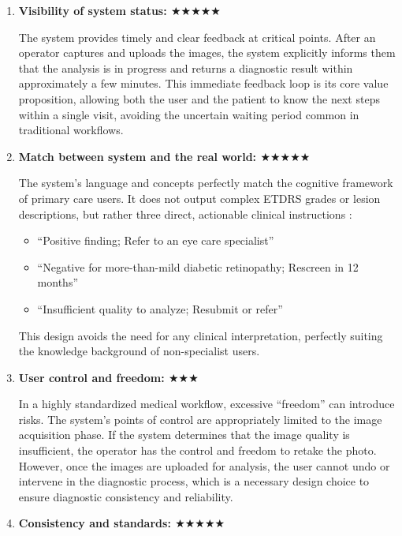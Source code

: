 \documentclass[sigplan,screen]{acmart}
\begin{document}
\begin{enumerate}
\item \textbf{Visibility of system status: $\bigstar\bigstar\bigstar\bigstar\bigstar$}

The system provides timely and clear feedback at critical points. After an operator captures and uploads the images, the system explicitly informs them that the analysis is in progress and returns a diagnostic result within approximately a few minutes. This immediate feedback loop is its core value proposition, allowing both the user and the patient to know the next steps within a single visit, avoiding the uncertain waiting period common in traditional workflows.

\item \textbf{Match between system and the real world: $\bigstar\bigstar\bigstar\bigstar\bigstar$}

The system's language and concepts perfectly match the cognitive framework of primary care users. It does not output complex ETDRS grades or lesion descriptions, but rather three direct, actionable clinical instructions \cite{fda2018denovo_summary}:
\begin{itemize}
\item ``Positive finding; Refer to an eye care specialist''
\item ``Negative for more-than-mild diabetic retinopathy; Rescreen in 12 months''
\item ``Insufficient quality to analyze; Resubmit or refer''
\end{itemize}
This design avoids the need for any clinical interpretation, perfectly suiting the knowledge background of non-specialist users.

\item \textbf{User control and freedom: $\bigstar\bigstar\bigstar$}

In a highly standardized medical workflow, excessive ``freedom'' can introduce risks. The system's points of control are appropriately limited to the image acquisition phase. If the system determines that the image quality is insufficient, the operator has the control and freedom to retake the photo. However, once the images are uploaded for analysis, the user cannot undo or intervene in the diagnostic process, which is a necessary design choice to ensure diagnostic consistency and reliability.

\item \textbf{Consistency and standards: $\bigstar\bigstar\bigstar\bigstar\bigstar$}


\end{enumerate}
\end{document}
